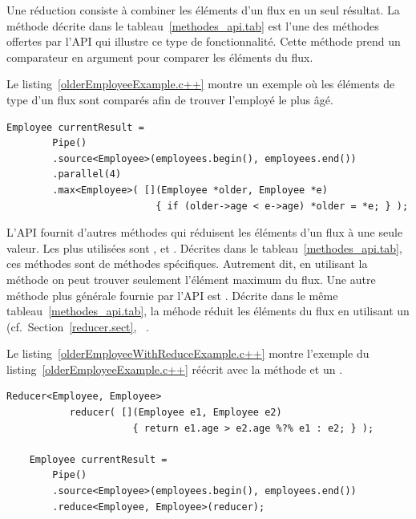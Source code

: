 Une r\'eduction
consiste \`a combiner les \'el\'ements d'un flux en un seul r\'esultat. La m\'ethode  d\'ecrite dans le tableau~\ref{methodes_api.tab} est l'une des m\'ethodes offertes par l'{API} qui illustre ce type de fonctionnalit\'e. Cette m\'ethode prend un comparateur en argument pour comparer les \'el\'ements du flux. 

Le listing~\ref{olderEmployeeExample.c++} montre un exemple o\`u les \'el\'ements de type  d'un flux sont compar\'es afin de trouver l'employ\'e le plus \^ag\'e.

\begin{Listing}[tbp]
\begin{lstlisting}[gobble=4]
    Employee currentResult = 
        Pipe()
        .source<Employee>(employees.begin(), employees.end())
        .parallel(4)
        .max<Employee>( [](Employee *older, Employee *e) 
                          { if (older->age < e->age) *older = *e; } );
\end{lstlisting}
\caption{Un pipeline pour identifier l'employ\'e le plus ag\'e.}
\label{olderEmployeeExample.c++}
\end{Listing}

L'{API} fournit d'autres m\'ethodes qui r\'eduisent les \'el\'ements d'un flux \`a une seule valeur. Les plus utilis\'ees sont ,  et . D\'ecrites dans le tableau~\ref{methodes_api.tab}, ces m\'ethodes sont de m\'ethodes sp\'ecifiques. Autrement dit, en utilisant la m\'ethode  on peut trouver seulement l'\'el\'ement maximum du flux. Une autre m\'ethode plus g\'en\'erale fournie par l'{API} est . D\'ecrite dans le m\^eme tableau~\ref{methodes_api.tab}, la m\'ehode  r\'eduit les \'el\'ements du flux en utilisant un  (cf.~Section~\ref{reducer.sect}, ~\pageref{reducer.sect}. 

Le listing~\ref{olderEmployeeWithReduceExample.c++} montre l'exemple du listing~\ref{olderEmployeeExample.c++} r\'e\'ecrit avec la m\'ethode  et un .

\begin{Listing}[tbp]
\begin{lstlisting}[gobble=4,escapechar=\%]
    Reducer<Employee, Employee> 
           reducer( [](Employee e1, Employee e2) 
                      { return e1.age > e2.age %?% e1 : e2; } );

    Employee currentResult =
        Pipe()
        .source<Employee>(employees.begin(), employees.end())
        .reduce<Employee, Employee>(reducer);

\end{lstlisting}
\caption{Un autre pipeline pour identifier l'employ\'e le plus ag\'e, mais avec un .}
\label{olderEmployeeWithReduceExample.c++}
\end{Listing}


